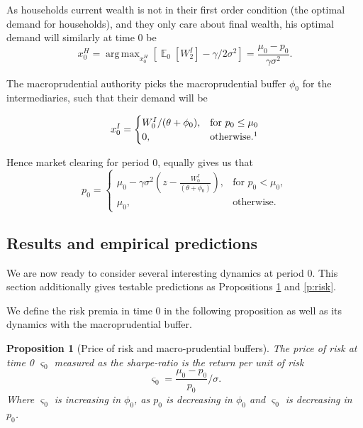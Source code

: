 \documentclass[11pt]{article}
\DeclareMathOperator{\E}{\mathbb{E}} %
\newtheorem{proposition}{Proposition}
\DeclareMathOperator*{\argmax}{arg\,max} %
\begin{document}
As households current wealth is not in their first order condition (the optimal demand for households), and they only care about final wealth, his optimal demand will similarly at time 0 be
\begin{equation}
x^{H}_0 = \argmax_{x^H_0}\left[\E_0[W^I_2] - \gamma/2\sigma^2\right]
= \frac{\mu_0 - p_0}{\gamma\sigma^2}.
\end{equation} 

The macroprudential authority picks the macroprudential buffer $\phi_0$ for the intermediaries, such that their demand will be

\begin{equation}
x^I_0 = \begin{cases}
 W^I_0/(\theta + \phi_0), &\text{for $p_0 \leq \mu_0$}\\
 0, &\text{otherwise.\footnotemark}
\end{cases}
\end{equation}

Hence market clearing for period 0, equally gives us that
 \begin{equation}
 p_0 = \begin{cases}
\mu_0 - \gamma\sigma^2 \left(z-\frac{W^I_0}{(\theta + \phi_0)}\right), &\text{for } p_0 < \mu_0,\\
\mu_0, &\text{otherwise.}
\end{cases}
 \end{equation}

\subsection*{Results and empirical predictions}
We are now ready to consider several interesting dynamics at period 0. This section additionally gives testable predictions as Propositions \ref{p:price} and \ref{p:risk}.

We define the risk premia in time 0 in the following proposition as well as its dynamics with the macroprudential buffer.

\begin{proposition}[Price of risk and macro-prudential buffers]
\label{p:price}
The price of risk at time 0 $\varsigma_0$ measured as the sharpe-ratio is the return per unit of risk
\begin{equation}
\varsigma_0 = \frac{\mu_0 - p_0}{p_0}/\sigma.
\end{equation}
Where $\varsigma_0$ is increasing in $\phi_0$, as $p_0$ is decreasing in $\phi_0$ and $\varsigma_0$ is decreasing in $p_0$.
\end{proposition}
\end{document}
